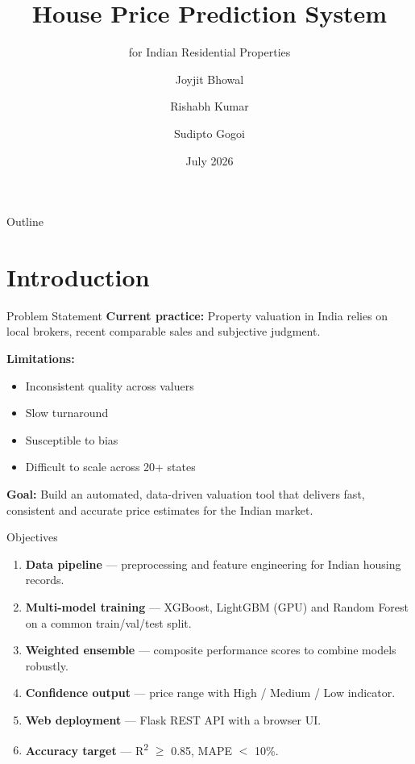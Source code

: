 \documentclass[aspectratio=169, 12pt]{beamer}
\title{House Price Prediction System}
\subtitle{for Indian Residential Properties}
\author[Team]{%
  Joyjit Bhowal \and
  Rishabh Kumar \and
  Sudipto Gogoi
}
\institute[IIT Guwahati]{Indian Institute of Technology Guwahati}
\date{July 2026}
\begin{document}
\begin{frame}
  \titlepage
\end{frame}

\begin{frame}{Outline}
  \tableofcontents
\end{frame}

\section{Introduction}

\begin{frame}{Problem Statement}
  \textbf{Current practice:} Property valuation in India relies on local
  brokers, recent comparable sales and subjective judgment.

  \medskip
  \textbf{Limitations:}
  \begin{itemize}
    \item Inconsistent quality across valuers
    \item Slow turnaround
    \item Susceptible to bias
    \item Difficult to scale across 20+ states
  \end{itemize}

  \medskip
  \textbf{Goal:} Build an automated, data-driven valuation tool that delivers
  fast, consistent and accurate price estimates for the Indian market.
\end{frame}

\begin{frame}{Objectives}
  \begin{enumerate}
    \item \textbf{Data pipeline} --- preprocessing and feature engineering for
          Indian housing records.
    \item \textbf{Multi-model training} --- XGBoost, LightGBM (GPU) and Random
          Forest on a common train/val/test split.
    \item \textbf{Weighted ensemble} --- composite performance scores to combine
          models robustly.
    \item \textbf{Confidence output} --- price range with High / Medium / Low
          indicator.
    \item \textbf{Web deployment} --- Flask REST API with a browser UI.
    \item \textbf{Accuracy target} --- R\textsuperscript{2} $\ge$ 0.85,
          MAPE $<$ 10\%.
  \end{enumerate}
\end{frame}
\end{document}

